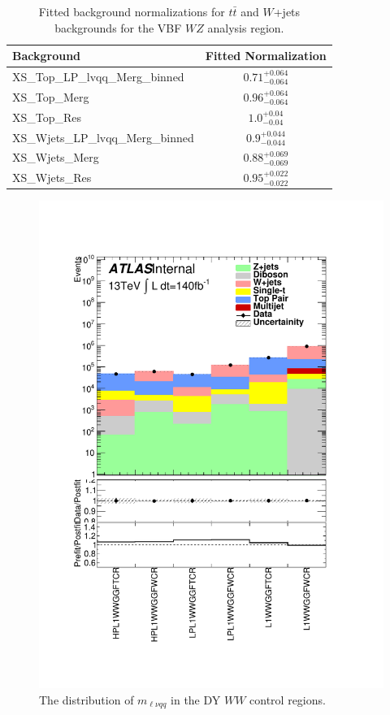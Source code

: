 \begin{table}
\begin{tabular}{|l|c|}
\hline
Background & Fitted Normalization \\\hline
XS\_Top\_LP\_lvqq\_Merg\_binned & $0.71^{+0.064}_{-0.064}$ \\\hline
XS\_Top\_Merg & $0.96^{+0.064}_{-0.064}$ \\\hline
XS\_Top\_Res & $1.0^{+0.04}_{-0.04}$ \\\hline
XS\_Wjets\_LP\_lvqq\_Merg\_binned & $0.9^{+0.044}_{-0.044}$ \\\hline
XS\_Wjets\_Merg & $0.88^{+0.069}_{-0.069}$ \\\hline
XS\_Wjets\_Res & $0.95^{+0.022}_{-0.022}$ \\\hline
\end{tabular}
\caption{Fitted background normalizations for $t\bar{t}$ and $W$+jets backgrounds for the VBF $WZ$ analysis region.}
\label{tbl:hvtwzvbf_norm}
\end{table}


\begin{figure}[h!]
  \centering
  \includegraphics[width=\hsize]{figures/results/HVTWW/PlotyieldTable_postfit.pdf}
 \caption{The distribution of $m_{\ell\nu qq}$ in the DY $WW$ control regions.} 
  \label{fig:hvtww_cr_postfit}
\end{figure} 
\FloatBarrier

